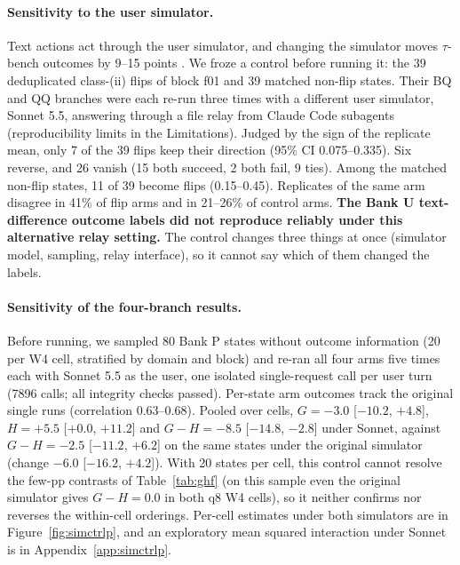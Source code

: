 \paragraph{Sensitivity to the user simulator.} Text actions act through the user simulator, and changing the simulator moves $\tau$-bench outcomes by 9--15 points \citep{seshadri2026lost,jain2026userproxybench}. %
We froze a control before running it: the 39 deduplicated class-(ii) flips of block f01 and 39 matched non-flip states. Their BQ and QQ branches were each re-run three times with a different user simulator, Sonnet 5.5, answering through a file relay from Claude Code subagents (reproducibility limits in the Limitations). %
Judged by the sign of the replicate mean, only 7 of the 39 flips keep their direction (95\% CI 0.075--0.335). Six reverse, and 26 vanish (15 both succeed, 2 both fail, 9 ties). Among the matched non-flip states, 11 of 39 become flips (0.15--0.45). Replicates of the same arm disagree in 41\% of flip arms and in 21--26\% of control arms. %
\textbf{The Bank U text-difference outcome labels did not reproduce reliably under this alternative relay setting.} The control changes three things at once (simulator model, sampling, relay interface), so it cannot say which of them changed the labels.

\paragraph{Sensitivity of the four-branch results.}
\label{app:simctrlpmain}
Before running, we sampled 80 Bank P states without outcome information (20 per W4 cell, stratified by domain and block) and re-ran all four arms five times each with Sonnet 5.5 as the user, one isolated single-request call per user turn (7896 calls; all integrity checks passed). %
Per-state arm outcomes track the original single runs (correlation 0.63--0.68). Pooled over cells, $G=-3.0$ [$-10.2$, $+4.8$], $H=+5.5$ [$+0.0$, $+11.2$] and $G-H=-8.5$ [$-14.8$, $-2.8$]\pp{} under Sonnet, against $G-H=-2.5$ [$-11.2$, $+6.2$] on the same states under the original simulator (change $-6.0$ [$-16.2$, $+4.2$]). %
With 20 states per cell, this control cannot resolve the few-pp contrasts of Table~\ref{tab:ghf} (on this sample even the original simulator gives $G-H=0.0$ in both q8 W4 cells), so it neither confirms nor reverses the within-cell orderings. %
Per-cell estimates under both simulators are in Figure~\ref{fig:simctrlp}, and an exploratory mean squared interaction under Sonnet is in Appendix~\ref{app:simctrlp}.

